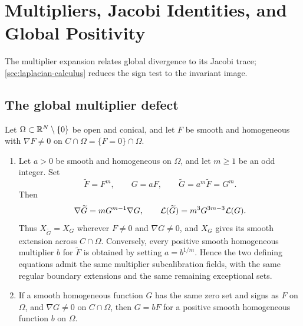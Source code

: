 \section[Multipliers and Global Positivity]{Multipliers, Jacobi Identities, and Global Positivity}
\label{sec:algebraic-jacobi}

The multiplier expansion relates global divergence to its Jacobi trace;
\cref{sec:laplacian-calculus} reduces the sign test to the invariant image.

\subsection{The global multiplier defect}

\begin{proposition}
\label{prop:potential-normal-form}
Let \(\Omega\subset\mathbb R^N\setminus\{0\}\) be open and conical, and
let \(F\) be smooth and homogeneous with \(\nabla F\neq0\) on
\(C\cap\Omega=\{F=0\}\cap\Omega\).
\begin{enumerate}[label=\textup{(\roman*)}]
 \item Let \(a>0\) be smooth and homogeneous on \(\Omega\), and
 let \(m\geq1\) be an odd integer.  Set
 \[
  \widetilde F=F^m,\qquad G=aF,\qquad
  \widetilde G=a^m\widetilde F=G^m.
 \]
 Then
 \begin{equation}\label{eq:odd-power-field}
  \nabla\widetilde G=mG^{m-1}\nabla G,\qquad
  \mathcal L(\widetilde G)=m^3G^{3m-3}\mathcal L(G).
 \end{equation}
 Thus \(X_{\widetilde G}=X_G\) wherever \(F\neq0\) and
 \(\nabla G\neq0\), and \(X_G\) gives its smooth extension across
 \(C\cap\Omega\).  Conversely, every positive smooth homogeneous
 multiplier \(b\) for \(\widetilde F\) is obtained by setting
 \(a=b^{1/m}\).  Hence the two defining equations admit the same
 multiplier subcalibration fields, with the same regular boundary
 extensions and the same remaining exceptional sets.
 \item If a smooth homogeneous function \(G\) has the same zero set
 and signs as \(F\) on \(\Omega\), and \(\nabla G\neq0\) on
 \(C\cap\Omega\), then \(G=bF\) for a positive smooth homogeneous
 function \(b\) on \(\Omega\).
\end{enumerate}
\end{proposition}

